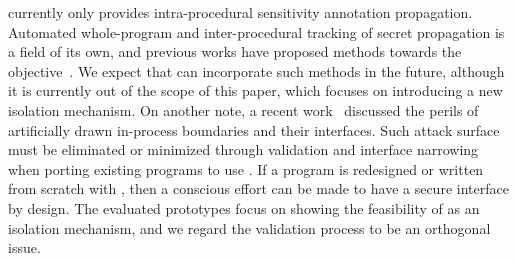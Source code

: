 \thename currently only provides intra-procedural sensitivity annotation propagation.
Automated whole-program and inter-procedural tracking of secret propagation is a field of its own, and previous works have proposed methods towards the objective~\cite{cryptompk,ptrsplit,dynpta,aces}.
We expect that \thename can incorporate such methods in the future, although it is currently out of the scope of this paper, which focuses on introducing a new isolation mechanism.
On another note, a recent work~\cite{civ} discussed the perils of artificially drawn in-process boundaries and their interfaces.
Such attack surface must be eliminated or minimized through validation and interface narrowing when porting existing programs to use \thename.
If a program is redesigned or written from scratch with \thename, then a conscious effort can be made to have a secure interface by design.
The evaluated prototypes focus on showing the feasibility of \thename as an isolation mechanism, and we regard the validation process to be an orthogonal issue.














